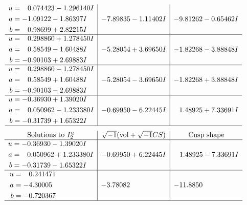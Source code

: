 \documentclass[1p]{elsarticle_modified}
\theoremstyle{definition}
\newcommand{\I}{\sqrt{-1}}
\begin{document}
$$\begin{array}{c|c|c}
\begin{aligned}
u &= \phantom{-}0.074423 - 1.296140 I \\
a &= -1.09122 - 1.86397 I \\
b &= \phantom{-}0.98699 + 2.82215 I\end{aligned}
 & -7.89835 - 1.11402 I & -9.81262 - 0.65462 I \\ \hline\begin{aligned}
u &= \phantom{-}0.298860 + 1.278450 I \\
a &= \phantom{-}0.58549 - 1.60488 I \\
b &= -0.90103 + 2.69883 I\end{aligned}
 & -5.28054 + 3.69650 I & -1.82268 - 3.88848 I \\ \hline\begin{aligned}
u &= \phantom{-}0.298860 - 1.278450 I \\
a &= \phantom{-}0.58549 + 1.60488 I \\
b &= -0.90103 - 2.69883 I\end{aligned}
 & -5.28054 - 3.69650 I & -1.82268 + 3.88848 I \\ \hline\begin{aligned}
u &= -0.36930 + 1.39020 I \\
a &= \phantom{-}0.050962 - 1.233380 I \\
b &= -0.31739 + 1.65322 I\end{aligned}
 & -0.69950 - 6.22445 I & \phantom{-}1.48925 + 7.33691 I\\
 \hline 
 \end{array}$$\newpage$$\begin{array}{c|c|c}  
\text{Solutions to }I^u_{2}& \I (\text{vol} + \sqrt{-1}CS) & \text{Cusp shape}\\
 \hline 
\begin{aligned}
u &= -0.36930 - 1.39020 I \\
a &= \phantom{-}0.050962 + 1.233380 I \\
b &= -0.31739 - 1.65322 I\end{aligned}
 & -0.69950 + 6.22445 I & \phantom{-}1.48925 - 7.33691 I \\ \hline\begin{aligned}
u &= \phantom{-}0.241471\phantom{ +0.000000I} \\
a &= -4.30005\phantom{ +0.000000I} \\
b &= -0.720367\phantom{ +0.000000I}\end{aligned}
 & -3.78082\phantom{ +0.000000I} & -11.8850\phantom{ +0.000000I}\\
 \hline 
 \end{array}$$\newpage\newpage\renewcommand{\arraystretch}{1}
\end{document}
